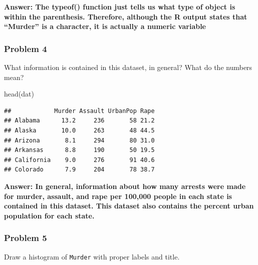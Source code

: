 \documentclass[
]{article}
\newenvironment{Shaded}{\begin{snugshade}}{\end{snugshade}}
\newcommand{\AttributeTok}[1]{\textcolor[rgb]{0.77,0.63,0.00}{#1}}
\newcommand{\DecValTok}[1]{\textcolor[rgb]{0.00,0.00,0.81}{#1}}
\newcommand{\FunctionTok}[1]{\textcolor[rgb]{0.00,0.00,0.00}{#1}}
\newcommand{\NormalTok}[1]{#1}
\newcommand{\SpecialCharTok}[1]{\textcolor[rgb]{0.00,0.00,0.00}{#1}}
\newcommand{\StringTok}[1]{\textcolor[rgb]{0.31,0.60,0.02}{#1}}
\begin{document}
\textbf{Answer: The typeof() function just tells us what type of object
is within the parenthesis. Therefore, although the R output states that
``Murder'' is a character, it is actually a numeric variable}

\hypertarget{problem-4}{%
\subsubsection{Problem 4}\label{problem-4}}

What information is contained in this dataset, in general? What do the
numbers mean?

\begin{Shaded}
\begin{Highlighting}[]
\FunctionTok{head}\NormalTok{(dat)}
\end{Highlighting}
\end{Shaded}

\begin{verbatim}
##            Murder Assault UrbanPop Rape
## Alabama      13.2     236       58 21.2
## Alaska       10.0     263       48 44.5
## Arizona       8.1     294       80 31.0
## Arkansas      8.8     190       50 19.5
## California    9.0     276       91 40.6
## Colorado      7.9     204       78 38.7
\end{verbatim}

\textbf{Answer: In general, information about how many arrests were made
for murder, assault, and rape per 100,000 people in each state is
contained in this dataset. This dataset also contains the percent urban
population for each state.}

\hypertarget{problem-5}{%
\subsubsection{Problem 5}\label{problem-5}}

Draw a histogram of \texttt{Murder} with proper labels and title.

\begin{Shaded}
\end{Shaded}
\end{document}
